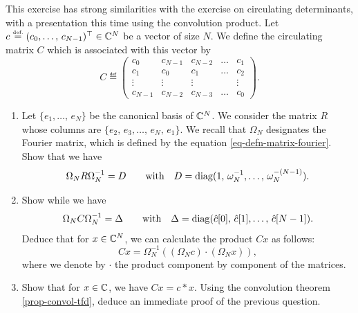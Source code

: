  
\begin{exo}
\label{exo-circulating-matrix}
 
  This exercise has strong similarities with the exercise  on circulating determinants, with a presentation this time using the convolution product. Let $ c \stackrel{\mbox{\upshape\tiny def.}}{=} (c_0, \ldots, \, c_{N-1})^\top \in \mathbb{C}^N $ be a vector of size $N$. We define the circulating matrix $ C $ which is associated with this vector by
\begin{equation*}
C \eqdef \begin{pmatrix} c_0 & c_{N-1} & c_{N-2} & \ldots & c_{1} \\c_1 & c_0 & c_1 & \ldots & c_{2} \\\vdots & \vdots & \vdots & & \vdots \\c_{N-1} & c_{N-2} & c_{N-3} & \ldots & c_{0} \end{pmatrix}.
\end{equation*}
\begin{enumerate}
\item Let $ \{e_1, \ldots, \, e_N\} $ be the canonical basis of $ \mathbb{C}^N $. We consider the matrix $ R $ whose columns are $ \{e_2, \, e_3, \ldots, \, e_N, \, e_1\} $. We recall that $ \Omega_N $ designates the Fourier matrix, which is defined by the equation \eqref{eq-defn-matrix-fourier}. Show that we have
\begin{equation*}
\Omega_N R \Omega_N^{-1} = D \quad \quad \text{with} \quad D = \operatorname{diag} (1, \, \omega_N^{-1}, \ldots, \, \omega_N^{- (N-1)}).
\end{equation*}
 
\item Show while we have
\begin{equation*}
\Omega_N C \Omega_N^{-1} = \Delta \quad \quad \text{with} \quad \Delta = \operatorname{diag} (\hat{c}[0], \, \hat{c}[1], \ldots, \, \hat{c}[N-1]).
\end{equation*}
Deduce that for $ x \in \mathbb{C}^N $, we can calculate the product $ C x $ as follows:
\begin{equation*}
C x = \Omega_N^{-1} \left((\Omega_N c) \cdot (\Omega_N x) \right),
\end{equation*}
where we denote by $ \cdot $ the product component by component of the matrices.
\item Show that for $ x \in \mathbb{C} $, we have $ C x = c * x $. Using the convolution theorem \ref{prop-convol-tfd}, deduce an immediate proof of the previous question.
\end{enumerate}
\end{exo}
 

